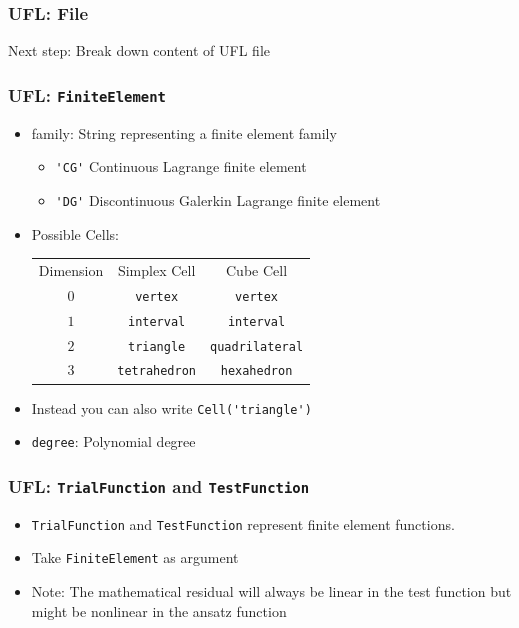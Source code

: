 \documentclass[aspectratio=169,11pt]{beamer}
\theoremstyle{definition}
\begin{document}
\begin{frame}
  \frametitle{UFL: File}
  Next step: Break down content of UFL file

  
\end{frame}

\begin{frame}[fragile]
  \frametitle{UFL: \lstinline{FiniteElement}}
  
  \vfill
  \begin{itemize}
  \item family: String representing a finite element family
    \begin{itemize}
    \item \lstinline{'CG'} Continuous Lagrange finite element
    \item \lstinline{'DG'} Discontinuous Galerkin Lagrange finite element
    \end{itemize}
  \item Possible Cells:
    \begin{tabu}{ccc}
      Dimension & Simplex Cell & Cube Cell \\
      $0$ & \lstinline{vertex} & \lstinline{vertex} \\
      $1$ & \lstinline{interval} & \lstinline{interval} \\
      $2$ & \lstinline{triangle} & \lstinline{quadrilateral} \\
      $3$ & \lstinline{tetrahedron} & \lstinline{hexahedron} \\
    \end{tabu}
  \item Instead you can also write \lstinline{Cell('triangle')}
  \item \lstinline{degree}: Polynomial degree
  \end{itemize}
\end{frame}

\begin{frame}[fragile]
  \frametitle{UFL: \lstinline{TrialFunction} and \lstinline{TestFunction}}

  
  \vfill
  \begin{itemize}
  \item \lstinline{TrialFunction} and \lstinline{TestFunction} represent finite element functions.
  \item Take \lstinline{FiniteElement} as argument
  \item Note: The mathematical residual will always be linear in the test function but might be nonlinear in the ansatz function
  \end{itemize}
\end{frame}
\end{document}
